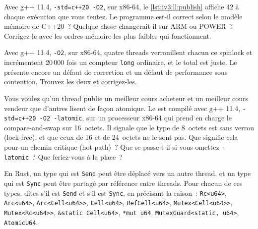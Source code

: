 \begin{question}\label{iq:iv3:low-latency:12}
Avec g++ 11.4, \texttt{-std=c++20 -O2}, sur x86-64, le \cref{lst:iv3:ll:publish} affiche 42 à chaque exécution que vous tentez. Le programme est-il correct selon le modèle mémoire de C++20~? Quelque chose changerait-il sur ARM ou POWER~? Corrigez-le avec les ordres mémoire les plus faibles qui fonctionnent.
\label{lst:iv3:ll:publish}
\end{question}

\begin{question}\label{iq:iv3:low-latency:13}
Avec g++ 11.4, \texttt{-O2}, sur x86-64, quatre threads verrouillent chacun ce spinlock et incrémentent 20\,000 fois un compteur \texttt{long} ordinaire, et le total est juste. Le  présente encore un défaut de correction et un défaut de performance sous contention. Trouvez les deux et corrigez-les.
\label{lst:iv3:ll:spinlock}
\end{question}

\begin{question}\label{iq:iv3:low-latency:14}
Vous voulez qu'un thread publie un meilleur cours acheteur et un meilleur cours vendeur que d'autres lisent de façon atomique. Le  est compilé avec g++ 11.4, \texttt{-std=c++20 -O2 -latomic}, sur un processeur x86-64 qui prend en charge le compare-and-swap sur 16~octets. Il signale que le type de 8~octets est sans verrou (lock-free), et que ceux de 16 et de 24~octets ne le sont pas. Que signifie cela pour un chemin critique (hot path)~? Que se passe-t-il si vous omettez \texttt{-latomic}~? Que feriez-vous à la place~?
\label{lst:iv3:ll:quote}
\end{question}

\begin{question}\label{iq:iv3:low-latency:15}
En Rust, un type qui est \texttt{Send} peut être déplacé vers un autre thread, et un type qui est \texttt{Sync} peut être partagé par référence entre threads. Pour chacun de ces types, dites s'il est \texttt{Send} et s'il est \texttt{Sync}, en précisant la raison~: \texttt{Rc<u64>}, \texttt{Arc<u64>}, \texttt{Arc<Cell<u64>{}>}, \texttt{Cell<u64>}, \texttt{RefCell<u64>}, \texttt{Mutex<Cell<u64>{}>}, \texttt{Mutex<Rc<u64>{}>}, \texttt{\&\textquotesingle{}static Cell<u64>}, \texttt{*mut u64}, \texttt{MutexGuard<\textquotesingle{}static, u64>}, \texttt{AtomicU64}.
\end{question}


